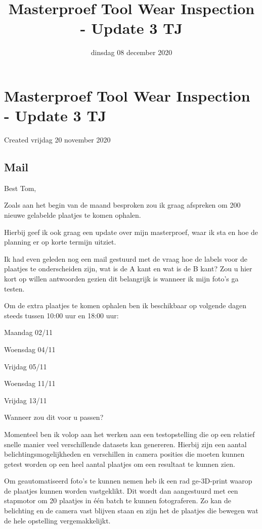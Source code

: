 \documentclass{scrartcl}
\title{Masterproef Tool Wear Inspection - Update 3 TJ}
\date{dinsdag 08 december 2020}
\author{}
\begin{document}
\maketitle

		\section{Masterproef Tool Wear Inspection - Update 3 TJ}

Created vrijdag 20 november 2020



\subsection{Mail}



Best Tom,

 

Zoals aan het begin van de maand besproken zou ik graag afspreken om 200 nieuwe gelabelde plaatjes te komen ophalen.

Hierbij geef ik ook graag een update over mijn masterproef, waar ik sta en hoe de planning er op korte termijn uitziet.

 

Ik had even geleden nog een mail gestuurd met de vraag hoe de labels voor de plaatjes te onderscheiden zijn, wat is de A kant en wat is de B kant? Zou u hier kort op willen antwoorden gezien dit belangrijk is wanneer ik mijn foto’s ga testen.

 

Om de extra plaatjes te komen ophalen ben ik beschikbaar op volgende dagen steeds tussen 10:00 uur en 18:00 uur:

Maandag 02/11

Woensdag 04/11

Vrijdag 05/11

Woensdag 11/11

Vrijdag 13/11

 

Wanneer zou dit voor u passen?

 

Momenteel ben ik volop aan het werken aan een testopstelling die op een relatief snelle manier veel verschillende datasets kan genereren. Hierbij zijn een aantal belichtingsmogelijkheden en verschillen in camera posities die moeten kunnen getest worden op een heel aantal plaatjes om een resultaat te kunnen zien.

Om geautomatiseerd foto’s te kunnen nemen heb ik een rad ge-3D-print waarop de plaatjes kunnen worden vastgeklikt. Dit wordt dan aangestuurd met een stapmotor om 20 plaatjes in één batch te kunnen fotograferen. Zo kan de belichting en de camera vast blijven staan en zijn het de plaatjes die bewegen wat de hele opstelling vergemakkelijkt.
\end{document}

